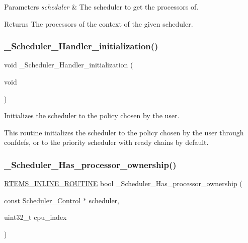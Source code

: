 \begin{DoxyParams}{Parameters}
{\em scheduler} & The scheduler to get the processors of.\\
\hline
\end{DoxyParams}
\begin{DoxyReturn}{Returns}
The processors of the context of the given scheduler. 
\end{DoxyReturn}
\mbox{\label{group__RTEMSScoreScheduler_ga17385f03f24b3fe3ead98e17b612ef32}} 
\subsubsection{\texorpdfstring{\_Scheduler\_Handler\_initialization()}{\_Scheduler\_Handler\_initialization()}}
{\footnotesize\ttfamily void \+\_\+\+Scheduler\+\_\+\+Handler\+\_\+initialization (\begin{DoxyParamCaption}\item[{void}]{ }\end{DoxyParamCaption})}



Initializes the scheduler to the policy chosen by the user. 

This routine initializes the scheduler to the policy chosen by the user through confdefs, or to the priority scheduler with ready chains by default. \mbox{\label{group__RTEMSScoreScheduler_gad1000f1383cee31019d9b3c2a37f3532}} 
\subsubsection{\texorpdfstring{\_Scheduler\_Has\_processor\_ownership()}{\_Scheduler\_Has\_processor\_ownership()}}
{\footnotesize\ttfamily \mbox{\hyperlink{group__RTEMSScoreBaseDefs_gac216239df231d5dbd15e3520b0b9313f}{R\+T\+E\+M\+S\+\_\+\+I\+N\+L\+I\+N\+E\+\_\+\+R\+O\+U\+T\+I\+NE}} bool \+\_\+\+Scheduler\+\_\+\+Has\+\_\+processor\+\_\+ownership (\begin{DoxyParamCaption}\item[{const \mbox{\hyperlink{struct__Scheduler__Control}{Scheduler\+\_\+\+Control}} $\ast$}]{scheduler,  }\item[{uint32\+\_\+t}]{cpu\+\_\+index }\end{DoxyParamCaption})}



